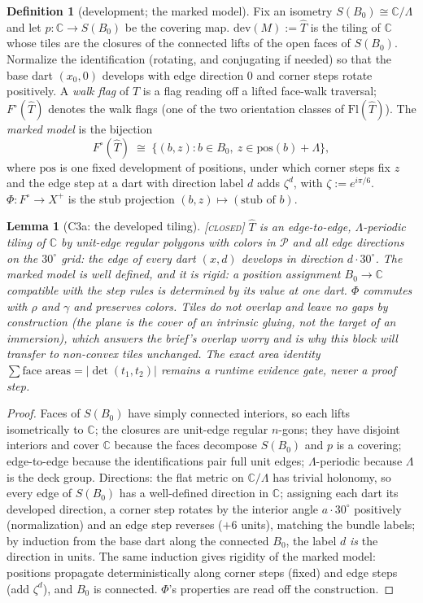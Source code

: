 \documentclass[11pt]{article}
\newtheorem{lemma}[theorem]{Lemma}
\theoremstyle{definition}
\newtheorem{definition}[theorem]{Definition}
\newcommand{\CLOSED}{\textnormal{\textsc{[closed]}}}
\newcommand{\Flags}{\mathrm{Fl}}
\newcommand{\dev}{\mathrm{dev}}
\newcommand{\C}{\mathbb{C}}
\begin{document}
\begin{definition}[development; the marked model]\label{def:dev}
Fix an isometry $S(B_0) \cong \C/\Lambda$ and let $p : \C \to S(B_0)$ be the covering
map. $\dev(M) := \hat T$ is the tiling of $\C$ whose tiles are the closures of the
connected lifts of the open faces of $S(B_0)$. Normalize the identification (rotating,
and conjugating if needed) so that the base dart $(x_0, 0)$ develops with edge direction
$0$ and corner steps rotate positively. A \emph{walk flag} of $\hat T$ is a flag reading
off a lifted face-walk traversal; $F^{\circ}(\hat T)$ denotes the walk flags (one of the
two orientation classes of $\Flags(\hat T)$). The \emph{marked model} is the bijection
\[
F^{\circ}(\hat T) \;\cong\; \{(b, z) : b \in B_0,\ z \in \mathrm{pos}(b) + \Lambda\},
\]
where $\mathrm{pos}$ is one fixed development of positions, under which corner steps fix
$z$ and the edge step at a dart with direction label $d$ adds $\zeta^d$, with
$\zeta := e^{i\pi/6}$. $\Phi : F^{\circ} \to X^+$ is the stub projection
$(b, z) \mapsto (\text{stub of } b)$.
\end{definition}

\begin{lemma}[C3a: the developed tiling]\label{lem:C3a} \CLOSED\;
$\hat T$ is an edge-to-edge, $\Lambda$-periodic tiling of $\C$ by unit-edge regular
polygons with colors in $\mathcal{P}$ and all edge directions on the $30^\circ$ grid:
the edge of every dart $(x,d)$ develops in direction $d \cdot 30^\circ$. The marked
model is well defined, and it is \emph{rigid}: a position assignment
$B_0 \to \C$ compatible with the step rules is determined by its value at one dart.
$\Phi$ commutes with $\rho$ and $\gamma$ and preserves colors. Tiles do not overlap and
leave no gaps by construction (the plane is the cover of an intrinsic gluing, not the
target of an immersion), which answers the brief's overlap worry and is why this block
will transfer to non-convex tiles unchanged. The exact area identity
$\sum \text{face areas} = |\det(t_1, t_2)|$ remains a runtime evidence gate, never a
proof step.
\end{lemma}

\begin{proof}
Faces of $S(B_0)$ have simply connected interiors, so each lifts isometrically to $\C$;
the closures are unit-edge regular $n$-gons; they have disjoint interiors and cover
$\C$ because the faces decompose $S(B_0)$ and $p$ is a covering; edge-to-edge because
the identifications pair full unit edges; $\Lambda$-periodic because $\Lambda$ is the
deck group. Directions: the flat metric on $\C/\Lambda$ has trivial holonomy, so every
edge of $S(B_0)$ has a well-defined direction in $\C$; assigning each dart its developed
direction, a corner step rotates by the interior angle $a \cdot 30^\circ$ positively
(normalization) and an edge step reverses ($+6$ units), matching the bundle labels; by
induction from the base dart along the connected $B_0$, the label $d$ \emph{is} the
direction in units. The same induction gives rigidity of the marked model: positions
propagate deterministically along corner steps (fixed) and edge steps (add $\zeta^d$),
and $B_0$ is connected. $\Phi$'s properties are read off the construction.
\end{proof}
\end{document}
